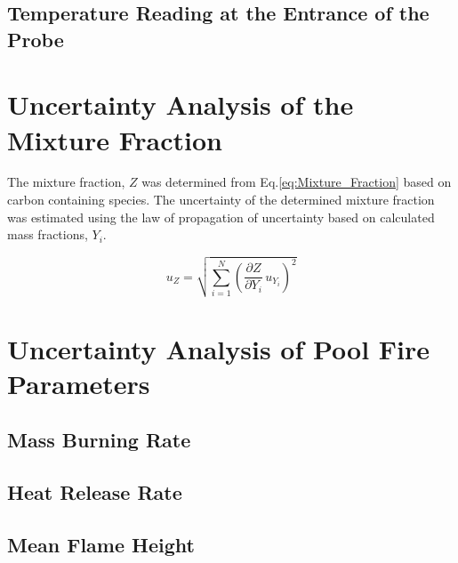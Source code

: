 \documentclass[12pt]{article}
\begin{document}
\subsection{Temperature Reading at the Entrance of the Probe}
\label{ssec:Probe_Temp}

\pagebreak

\section{Uncertainty Analysis of the Mixture Fraction}\label{sec:Uncertainty_Mix_Frac}
The mixture fraction, $Z$ was determined from Eq.\ref{eq:Mixture_Fraction} based on carbon containing species. The uncertainty of the determined mixture fraction was estimated using the law of propagation of uncertainty based on calculated mass fractions, $Y_{i}$. 

\begin{equation}
\label{eq:mixture_frac_uncertainty}
u_{\scriptscriptstyle Z}=\sqrt{{\sum_{i=1}^{N}{\left(\frac{\partial Z}{\partial Y_{i}}\,u_{\scriptscriptstyle Y_{i}} \right)}^2}}
\end{equation}

\pagebreak

\section{Uncertainty Analysis of Pool Fire Parameters}\label{sec:Uncertainty_Pool_Fire_Parameters}

\subsection{Mass Burning Rate}
\label{ssec:Mass_Burning_Rate}

\subsection{Heat Release Rate}
\label{ssec:Heat_Release_Rate}

\subsection{Mean Flame Height}
\label{ssec:Mean_Flame_Height}

\pagebreak
\end{document}
